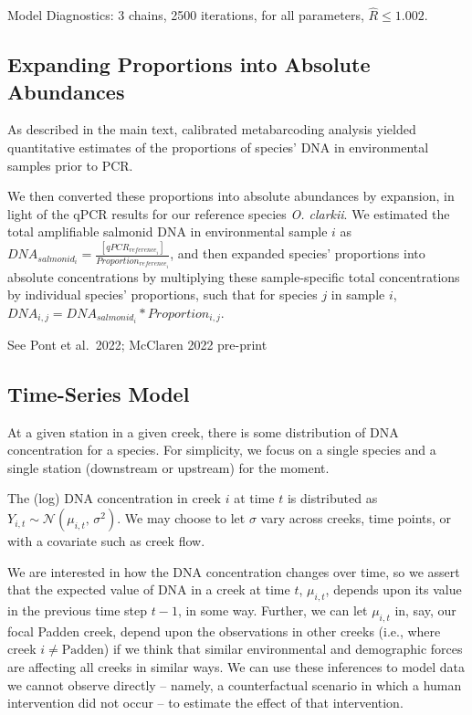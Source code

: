 \documentclass[
]{article}
\begin{document}
Model Diagnostics: 3 chains, 2500 iterations, for all parameters,
\(\hat{R} \leq 1.002\).

\hypertarget{expanding-proportions-into-absolute-abundances}{%
\subsection{Expanding Proportions into Absolute
Abundances}\label{expanding-proportions-into-absolute-abundances}}

As described in the main text, calibrated metabarcoding analysis yielded
quantitative estimates of the proportions of species' DNA in
environmental samples prior to PCR.

We then converted these proportions into absolute abundances by
expansion, in light of the qPCR results for our reference species
\emph{O. clarkii}. We estimated the total amplifiable salmonid DNA in
environmental sample \(i\) as
\(DNA_{salmonid_{i}} = \frac{[qPCR_{reference_{i}}]}{Proportion_{reference_{i}}}\),
and then expanded species' proportions into absolute concentrations by
multiplying these sample-specific total concentrations by individual
species' proportions, such that for species \(j\) in sample \(i\),
\(DNA_{i,j} = DNA_{salmonid_{i}} * Proportion_{i,j}\).

See Pont et al.~2022; McClaren 2022 pre-print

\hypertarget{time-series-model}{%
\subsection{Time-Series Model}\label{time-series-model}}

At a given station in a given creek, there is some distribution of DNA
concentration for a species. For simplicity, we focus on a single
species and a single station (downstream or upstream) for the moment.

The (log) DNA concentration in creek \(i\) at time \(t\) is distributed
as \(Y_{i,t} \sim \mathcal{N}(\mu_{i,t},\,\sigma^{2})\). We may choose
to let \(\sigma\) vary across creeks, time points, or with a covariate
such as creek flow.

We are interested in how the DNA concentration changes over time, so we
assert that the expected value of DNA in a creek at time \(t\),
\(\mu_{i,t}\), depends upon its value in the previous time step \(t-1\),
in some way. Further, we can let \(\mu_{i,t}\) in, say, our focal Padden
creek, depend upon the observations in other creeks (i.e., where creek
\(i \neq \text{Padden}\)) if we think that similar environmental and
demographic forces are affecting all creeks in similar ways. We can use
these inferences to model data we cannot observe directly -- namely, a
counterfactual scenario in which a human intervention did not occur --
to estimate the effect of that intervention.
\end{document}
